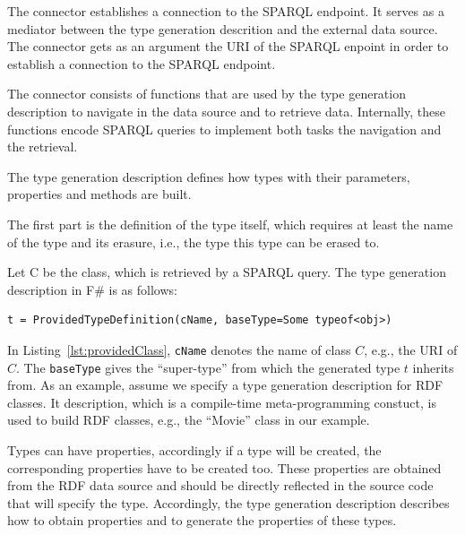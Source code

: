 \documentclass{llncs} %
\newcommand{\ggr}[1]{\textcolor{magenta}{comment Gerd: \textit{#1}}}
\newcommand{\fs}{\textsf{F\#}\xspace}
\begin{document}
The connector establishes a connection to the SPARQL endpoint. It serves as a mediator
between the type generation descrition and the external data source.
The connector gets as an argument the URI of the SPARQL enpoint
in order to establish a connection to the SPARQL endpoint.


The connector consists of functions that are used by the type generation description
to navigate in the data source and to retrieve data. Internally, these functions
encode SPARQL queries to implement both tasks the navigation and the retrieval.

%
%
%





The type generation description defines how types with their parameters,
properties and methods are built.

The first part is the definition of the type itself, which requires at least the
name of the type and its erasure, i.e., the type this type can be erased to.

Let C be the class, which is retrieved by a SPARQL query. The type generation description in \fs
is as follows:

\begin{lstlisting}[style=code, caption={\textbf{Type Rule:} Type Generation Description for RDF Class C}, label={lst:providedClass}]
t = ProvidedTypeDefinition(cName, baseType=Some typeof<obj>)
\end{lstlisting}

In Listing~\ref{lst:providedClass}, \texttt{cName} denotes the name of class $C$, e.g., the URI of $C$.
The \texttt{baseType} gives the ``super-type'' from which the generated type $t$ inherits from.
As an example, assume we specify a type generation description for RDF classes.
It description, which is a compile-time meta-programming constuct, is
used to build RDF classes, e.g., the ``Movie'' class in our example.


Types can have properties, accordingly if a type will be created, the corresponding properties
have to be created too. These properties are obtained from the RDF data source and should
be directly reflected in the source code that will specify the type.
Accordingly, the type generation description describes how to obtain properties and to
generate the properties of these types.
\end{document}

